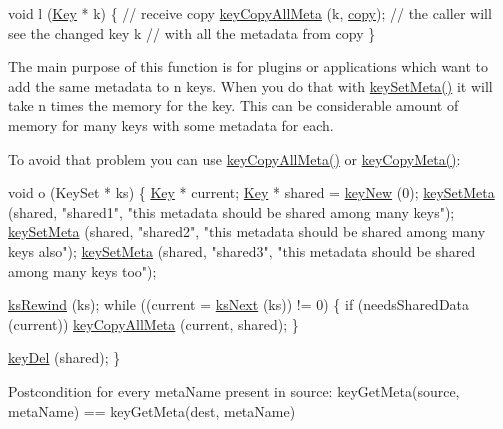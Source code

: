 \begin{DoxyCodeInclude}
\textcolor{keywordtype}{void} l (\hyperlink{classkdb_1_1Key_a5679f5cae63caddd64a60388b9cc77fa}{Key} * k)
\{
        \textcolor{comment}{// receive copy}
        \hyperlink{group__keymeta_ga8e63720a65610a29597494d0671f9401}{keyCopyAllMeta} (k, \hyperlink{classkdb_1_1Key_ab5bc93e22f4cf40b9d2b1fc32cc260be}{copy});
        \textcolor{comment}{// the caller will see the changed key k}
        \textcolor{comment}{// with all the metadata from copy}
\}
\end{DoxyCodeInclude}
 The main purpose of this function is for plugins or applications which want to add the same metadata to n keys. When you do that with \hyperlink{group__keymeta_gae1f15546b234ffb6007d8a31178652b9}{key\+Set\+Meta()} it will take n times the memory for the key. This can be considerable amount of memory for many keys with some metadata for each.

To avoid that problem you can use \hyperlink{group__keymeta_ga8e63720a65610a29597494d0671f9401}{key\+Copy\+All\+Meta()} or \hyperlink{group__keymeta_ga9a22b992478e613c8788bd460b4a1f0c}{key\+Copy\+Meta()}\+:


\begin{DoxyCodeInclude}
\textcolor{keywordtype}{void} o (KeySet * ks)
\{
        \hyperlink{classkdb_1_1Key_a5679f5cae63caddd64a60388b9cc77fa}{Key} * current;
        \hyperlink{classkdb_1_1Key_a5679f5cae63caddd64a60388b9cc77fa}{Key} * shared = \hyperlink{group__key_gad23c65b44bf48d773759e1f9a4d43b89}{keyNew} (0);
        \hyperlink{group__keymeta_gae1f15546b234ffb6007d8a31178652b9}{keySetMeta} (shared, \textcolor{stringliteral}{"shared1"}, \textcolor{stringliteral}{"this metadata should be shared among many keys"});
        \hyperlink{group__keymeta_gae1f15546b234ffb6007d8a31178652b9}{keySetMeta} (shared, \textcolor{stringliteral}{"shared2"}, \textcolor{stringliteral}{"this metadata should be shared among many keys also"});
        \hyperlink{group__keymeta_gae1f15546b234ffb6007d8a31178652b9}{keySetMeta} (shared, \textcolor{stringliteral}{"shared3"}, \textcolor{stringliteral}{"this metadata should be shared among many keys too"});

        \hyperlink{group__keyset_gabe793ff51f1728e3429c84a8a9086b70}{ksRewind} (ks);
        \textcolor{keywordflow}{while} ((current = \hyperlink{group__keyset_ga317321c9065b5a4b3e33fe1c399bcec9}{ksNext} (ks)) != 0)
        \{
                \textcolor{keywordflow}{if} (needsSharedData (current)) \hyperlink{group__keymeta_ga8e63720a65610a29597494d0671f9401}{keyCopyAllMeta} (current, shared);
        \}

        \hyperlink{group__key_ga3df95bbc2494e3e6703ece5639be5bb1}{keyDel} (shared);
\}
\end{DoxyCodeInclude}
 \begin{DoxyPostcond}{Postcondition}
for every meta\+Name present in source\+: key\+Get\+Meta(source, meta\+Name) == key\+Get\+Meta(dest, meta\+Name)
\end{DoxyPostcond}


